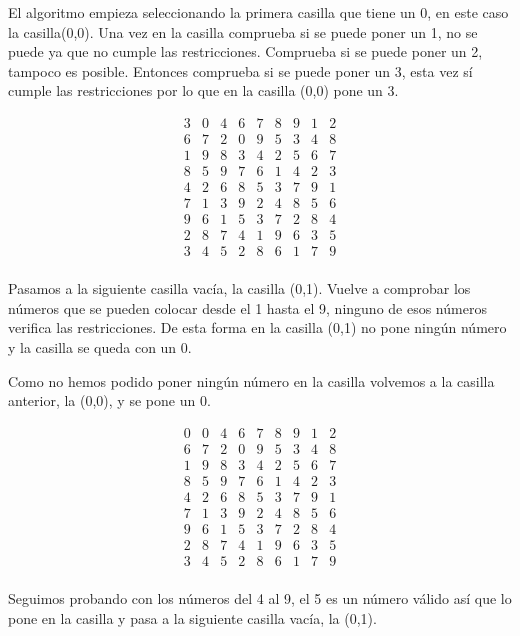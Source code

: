 \documentclass[11pt, a4paper]{article}
\theoremstyle{theorem-style}
\theoremstyle{definition-style}
\theoremstyle{remark-style}
\theoremstyle{example-style}
\begin{document}
El algoritmo empieza seleccionando la primera casilla que tiene un 0, en este caso la casilla(0,0).
Una vez en la casilla comprueba si se puede poner un 1, no se puede ya que no cumple las restricciones. Comprueba si se puede poner un 2, tampoco es posible. Entonces comprueba si se puede poner un 3, esta vez sí cumple las restricciones por lo que en la casilla (0,0) pone un 3.

\[
\begin{array}{ccccccccc}
3 & 0 & 4 & 6 & 7 & 8 & 9 & 1 & 2\\
6 & 7 & 2 & 0 & 9 & 5 & 3 & 4 & 8\\
1 & 9 & 8 & 3 & 4 & 2 & 5 & 6 & 7\\
8 & 5 & 9 & 7 & 6 & 1 & 4 & 2 & 3\\
4 & 2 & 6 & 8 & 5 & 3 & 7 & 9 & 1\\
7 & 1 & 3 & 9 & 2 & 4 & 8 & 5 & 6\\
9 & 6 & 1 & 5 & 3 & 7 & 2 & 8 & 4\\
2 & 8 & 7 & 4 & 1 & 9 & 6 & 3 & 5\\
3 & 4 & 5 & 2 & 8 & 6 & 1 & 7 & 9\\
\end{array}
\]

Pasamos a la siguiente casilla vacía, la casilla (0,1). Vuelve a comprobar los números que se pueden colocar desde el 1 hasta el 9, ninguno de esos números verifica las restricciones. De esta forma en la casilla (0,1) no pone ningún número y la casilla se queda con un 0.

Como no hemos podido poner ningún número en la casilla volvemos a la casilla anterior, la (0,0), y se pone un 0.

\[
\begin{array}{ccccccccc}
0 & 0 & 4 & 6 & 7 & 8 & 9 & 1 & 2\\
6 & 7 & 2 & 0 & 9 & 5 & 3 & 4 & 8\\
1 & 9 & 8 & 3 & 4 & 2 & 5 & 6 & 7\\
8 & 5 & 9 & 7 & 6 & 1 & 4 & 2 & 3\\
4 & 2 & 6 & 8 & 5 & 3 & 7 & 9 & 1\\
7 & 1 & 3 & 9 & 2 & 4 & 8 & 5 & 6\\
9 & 6 & 1 & 5 & 3 & 7 & 2 & 8 & 4\\
2 & 8 & 7 & 4 & 1 & 9 & 6 & 3 & 5\\
3 & 4 & 5 & 2 & 8 & 6 & 1 & 7 & 9\\
\end{array}
\]

Seguimos probando con los números del 4 al 9, el 5 es un número válido así que lo pone en la casilla y pasa a la siguiente casilla vacía, la (0,1).
\end{document}
